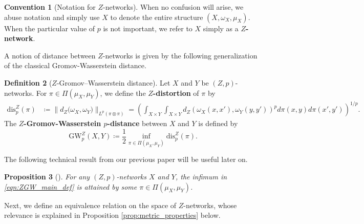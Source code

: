 \documentclass{article}
\newtheorem{proposition}{Proposition}[section]
\theoremstyle{definition}
\newtheorem{definition}[proposition]{Definition}
\newtheorem{convention}[proposition]{Convention}
\newcommand{\dgwz}{\mathrm{GW}_p^Z}
\begin{document}
\begin{convention}[Notation for $Z$-networks]
 When no confusion will arise, we abuse notation and simply use $X$ to denote the entire structure $(X,\omega_X,\mu_X)$. When the particular value of $p$ is not important, we refer to $X$ simply as a \textbf{$Z$-network}.
\end{convention}

A notion of distance between $Z$-networks is given by the following generalization of the classical Gromov-Wasserstein distance.

\begin{definition}[$Z$-Gromov--Wasserstein distance]\label{def:zgw}
Let $X$ and $Y$ be $(Z,p)$-networks.
For $\pi\in\Pi(\mu_X,\mu_Y)$, we define the \textbf{$Z$-distortion} of $\pi$ by
\begin{align*}
\mathrm{dis}^Z_p(\pi)
&\coloneqq  \bigl\| d_Z\bigl(\omega_X,\omega_Y\bigr)\bigr\|_{L^p(\pi \otimes \pi)} = \left(\displaystyle\int_{X \times Y} \int_{X \times Y} d_Z(\omega_X(x,x'),\omega_Y(y,y'))^p d\pi(x,y)d\pi(x',y') \right)^{1/p}.
%
%
%
%
%
\end{align*}
The \textbf{$Z$-Gromov-Wasserstein $p$-distance} between $X$ and $Y$ is defined by
\begin{equation}\label{eqn:ZGW_main_def}
\dgwz(X,Y)
\coloneqq\frac12\inf_{\pi\in\Pi(\mu_X,\mu_Y)} \mathrm{dis}^Z_p(\pi).
\end{equation}
\end{definition}
The following technical result from our previous paper will be useful later on.
\begin{proposition}[{\cite[Theorem 26]{bauer2025zgromovwassersteindistance}}]\label{prop:optimal_couplings}
    For any $(Z,p)$-networks $X$ and $Y$, the infimum in
    \eqref{eqn:ZGW_main_def} is attained by some $\pi\in\Pi(\mu_X,\mu_Y)$.
\end{proposition}

Next, we define an equivalence relation on the space of $Z$-networks, whose relevance is explained in Proposition \ref{prop:metric_properties} below.
\end{document}
